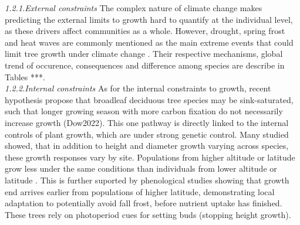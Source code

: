 \documentclass{article}
\begin{document}
\textit{1.2.1.External constraints}
The complex nature of climate change makes predicting the external limits to growth hard to quantify at the individual level, as these drivers affect communities as a whole. However, drought, spring frost and heat waves are commonly mentioned as the main extreme events that could limit tree growth under climate change \cite{tyree_xylem_2002, choat_triggers_2018, li_widespread_2023,trenberth_global_2014,intergovernmental_panel_on_climate_change_detection_2014,chiang_evidence_2021,polgar_leafout_2011,reinmann_compensatory_2023}. Their respective mechanisms, global trend of occurence, consequences and difference among species are describe in Tables ***. \\

\textit{1.2.2.Internal constraints}
As for the internal constraints to growth, recent hypothesis propose that broadleaf deciduous tree species may be sink-saturated, such that longer growing season with more carbon fixation do not necessarily increase growth (Dow2022). This one pathway is directly linked to the internal controls of plant growth, which are under strong genetic control. Many studied showed, that in addition to height and diameter growth varying across species, these growth responses vary by site. Populations from higher altitude or latitude grow less under the same conditions than individuals from lower altitude or latitude . This is further suported by phenological studies showing that growth end arrives earlier from populations of higher latitude, demonstrating local adaptation to potentially avoid fall frost, before nutrient uptake has finished. These trees rely on photoperiod cues for setting buds (stopping height growth). 
\end{document}
